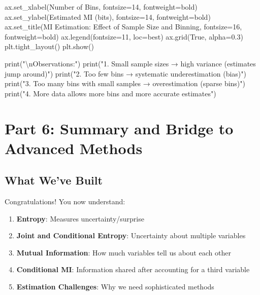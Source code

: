 \documentclass[
  11pt,
  letterpaper,
  oneside,
  openany]{book}
\newenvironment{Shaded}{\begin{snugshade}}{\end{snugshade}}
\newcommand{\BuiltInTok}[1]{\textcolor[rgb]{0.00,0.23,0.31}{#1}}
\newcommand{\CharTok}[1]{\textcolor[rgb]{0.13,0.47,0.30}{#1}}
\newcommand{\DecValTok}[1]{\textcolor[rgb]{0.68,0.00,0.00}{#1}}
\newcommand{\FloatTok}[1]{\textcolor[rgb]{0.68,0.00,0.00}{#1}}
\newcommand{\NormalTok}[1]{\textcolor[rgb]{0.00,0.23,0.31}{#1}}
\newcommand{\OperatorTok}[1]{\textcolor[rgb]{0.37,0.37,0.37}{#1}}
\newcommand{\StringTok}[1]{\textcolor[rgb]{0.13,0.47,0.30}{#1}}
\newcommand{\VariableTok}[1]{\textcolor[rgb]{0.07,0.07,0.07}{#1}}
\providecommand{\tightlist}{%
  \setlength{\itemsep}{0pt}\setlength{\parskip}{0pt}}
\begin{document}
\begin{Shaded}
\begin{Highlighting}[]
\NormalTok{ax.set\_xlabel(}\StringTok{\textquotesingle{}Number of Bins\textquotesingle{}}\NormalTok{, fontsize}\OperatorTok{=}\DecValTok{14}\NormalTok{, fontweight}\OperatorTok{=}\StringTok{\textquotesingle{}bold\textquotesingle{}}\NormalTok{)}
\NormalTok{ax.set\_ylabel(}\StringTok{\textquotesingle{}Estimated MI (bits)\textquotesingle{}}\NormalTok{, fontsize}\OperatorTok{=}\DecValTok{14}\NormalTok{, fontweight}\OperatorTok{=}\StringTok{\textquotesingle{}bold\textquotesingle{}}\NormalTok{)}
\NormalTok{ax.set\_title(}\StringTok{\textquotesingle{}MI Estimation: Effect of Sample Size and Binning\textquotesingle{}}\NormalTok{, }
\NormalTok{             fontsize}\OperatorTok{=}\DecValTok{16}\NormalTok{, fontweight}\OperatorTok{=}\StringTok{\textquotesingle{}bold\textquotesingle{}}\NormalTok{)}
\NormalTok{ax.legend(fontsize}\OperatorTok{=}\DecValTok{11}\NormalTok{, loc}\OperatorTok{=}\StringTok{\textquotesingle{}best\textquotesingle{}}\NormalTok{)}
\NormalTok{ax.grid(}\VariableTok{True}\NormalTok{, alpha}\OperatorTok{=}\FloatTok{0.3}\NormalTok{)}
\NormalTok{plt.tight\_layout()}
\NormalTok{plt.show()}

\BuiltInTok{print}\NormalTok{(}\StringTok{"}\CharTok{\textbackslash{}n}\StringTok{Observations:"}\NormalTok{)}
\BuiltInTok{print}\NormalTok{(}\StringTok{"1. Small sample sizes → high variance (estimates jump around)"}\NormalTok{)}
\BuiltInTok{print}\NormalTok{(}\StringTok{"2. Too few bins → systematic underestimation (bias)"}\NormalTok{)}
\BuiltInTok{print}\NormalTok{(}\StringTok{"3. Too many bins with small samples → overestimation (sparse bins)"}\NormalTok{)}
\BuiltInTok{print}\NormalTok{(}\StringTok{"4. More data allows more bins and more accurate estimates"}\NormalTok{)}
\end{Highlighting}
\end{Shaded}

\section{Part 6: Summary and Bridge to Advanced
Methods}\label{part-6-summary-and-bridge-to-advanced-methods}

\subsection{What We've Built}\label{what-weve-built}

Congratulations! You now understand:

\begin{enumerate}
\def\labelenumi{\arabic{enumi}.}
\tightlist
\item
  \textbf{Entropy}: Measures uncertainty/surprise
\item
  \textbf{Joint and Conditional Entropy}: Uncertainty about multiple
  variables
\item
  \textbf{Mutual Information}: How much variables tell us about each
  other
\item
  \textbf{Conditional MI}: Information shared after accounting for a
  third variable
\item
  \textbf{Estimation Challenges}: Why we need sophisticated methods
\end{enumerate}
\end{document}
